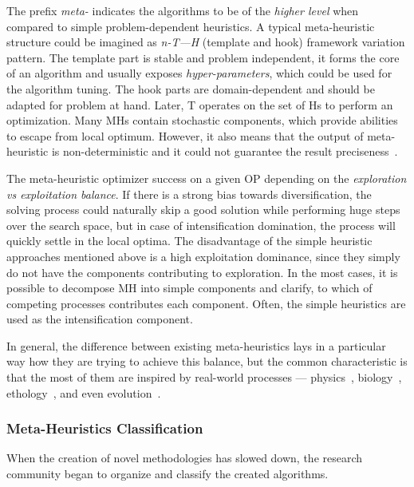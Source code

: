 The prefix \emph{meta-} indicates the algorithms to be of the \textit{higher level} when compared to simple problem-dependent heuristics. A typical meta-heuristic structure could be imagined as \emph{n-T—H} (template and hook) framework variation pattern.  The template part is stable and problem independent, it forms the core of an algorithm and usually exposes \textit{hyper-parameters}, which could be used for the algorithm tuning. The hook parts are domain-dependent and should be adapted for problem at hand. Later, T operates on the set of Hs to perform an optimization.
Many MHs contain stochastic components, which provide abilities to escape from local optimum. However, it also means that the output of meta-heuristic is non-deterministic and it could not guarantee the result preciseness~\cite{boussaid2013survey}.

The meta-heuristic optimizer success on a given OP depending on the \textit{exploration vs exploitation balance}. If there is a strong bias towards diversification, the solving process could naturally skip a good solution while performing huge steps over the search space, but in case of intensification domination, the process will quickly settle in the local optima. The disadvantage of the simple heuristic approaches mentioned above is a high exploitation dominance, since they simply do not have the components contributing to exploration. In the most cases, it is possible to decompose MH into simple components and clarify, to which of competing processes contributes each component. Often, the simple heuristics are used as the intensification component.

In general, the difference between existing meta-heuristics lays in a particular way how they are trying to achieve this balance, but the common characteristic is that the most of them are inspired by real-world processes — physics~\cite{van1987simulated}, biology~\cite{sastry2005genetic}, ethology~\cite{teodorovic2006bee,dorigo2007ant,salcedo2014coral}, and even evolution~\cite{beyer2002evolution,eiben2015evolutionary}.


\subsubsection{Meta-Heuristics Classification}
When the creation of novel methodologies has slowed down, the research community began to organize and classify the created algorithms.

